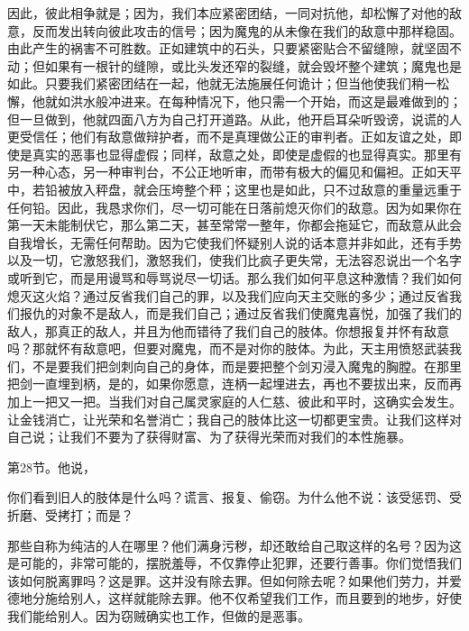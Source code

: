 因此，彼此相争就是；因为，我们本应紧密团结，一同对抗他，却松懈了对他的敌意，反而发出转向彼此攻击的信号；因为魔鬼的从未像在我们的敌意中那样稳固。由此产生的祸害不可胜数。正如建筑中的石头，只要紧密贴合不留缝隙，就坚固不动；但如果有一根针的缝隙，或比头发还窄的裂缝，就会毁坏整个建筑；魔鬼也是如此。只要我们紧密团结在一起，他就无法施展任何诡计；但当他使我们稍一松懈，他就如洪水般冲进来。在每种情况下，他只需一个开始，而这是最难做到的；但一旦做到，他就四面八方为自己打开道路。从此，他开启耳朵听毁谤，说谎的人更受信任；他们有敌意做辩护者，而不是真理做公正的审判者。正如友谊之处，即使是真实的恶事也显得虚假；同样，敌意之处，即使是虚假的也显得真实。那里有另一种心态，另一种审判台，不公正地听审，而带有极大的偏见和偏袒。正如天平中，若铅被放入秤盘，就会压垮整个秤；这里也是如此，只不过敌意的重量远重于任何铅。因此，我恳求你们，尽一切可能在日落前熄灭你们的敌意。因为如果你在第一天未能制伏它，那么第二天，甚至常常一整年，你都会拖延它，而敌意从此会自我增长，无需任何帮助。因为它使我们怀疑别人说的话本意并非如此，还有手势以及一切，它激怒我们，激怒我们，使我们比疯子更失常，无法容忍说出一个名字或听到它，而是用谩骂和辱骂说尽一切话。那么我们如何平息这种激情？我们如何熄灭这火焰？通过反省我们自己的罪，以及我们应向天主交账的多少；通过反省我们报仇的对象不是敌人，而是我们自己；通过反省我们使魔鬼喜悦，加强了我们的敌人，那真正的敌人，并且为他而错待了我们自己的肢体。你想报复并怀有敌意吗？那就怀有敌意吧，但要对魔鬼，而不是对你的肢体。为此，天主用愤怒武装我们，不是要我们把剑刺向自己的身体，而是要把整个剑刃浸入魔鬼的胸膛。在那里把剑一直埋到柄，是的，如果你愿意，连柄一起埋进去，再也不要拔出来，反而再加上一把又一把。当我们对自己属灵家庭的人仁慈、彼此和平时，这确实会发生。让金钱消亡，让光荣和名誉消亡；我自己的肢体比这一切都更宝贵。让我们这样对自己说；让我们不要为了获得财富、为了获得光荣而对我们的本性施暴。\par

第28节。他说，\par

你们看到旧人的肢体是什么吗？谎言、报复、偷窃。为什么他不说：该受惩罚、受折磨、受拷打；而是？\par

那些自称为纯洁的人在哪里？他们满身污秽，却还敢给自己取这样的名号？因为这是可能的，非常可能的，摆脱羞辱，不仅靠停止犯罪，还要行善事。你们觉悟我们该如何脱离罪吗？这是罪。这并没有除去罪。但如何除去呢？如果他们劳力，并爱德地分施给别人，这样就能除去罪。他不仅希望我们工作，而且要到的地步，好使我们能给别人。因为窃贼确实也工作，但做的是恶事。\par

